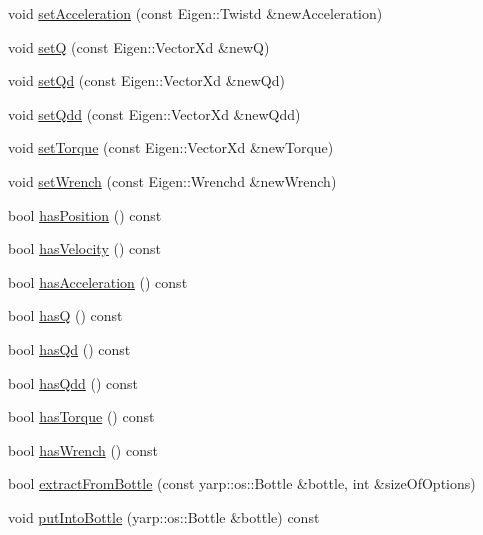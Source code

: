 \begin{DoxyCompactItemize}
\item 
void \hyperlink{classocra_1_1TaskState_ab408a5c4b442ac5ad3f5d50fec1aefdb}{set\+Acceleration} (const Eigen\+::\+Twistd \&new\+Acceleration)
\item 
void \hyperlink{classocra_1_1TaskState_a2a1821ebe86ba99e305debf366ce77f1}{setQ} (const Eigen\+::\+Vector\+Xd \&newQ)
\item 
void \hyperlink{classocra_1_1TaskState_a69d8a03ebd5c2c41e8108ff4b845ae49}{set\+Qd} (const Eigen\+::\+Vector\+Xd \&new\+Qd)
\item 
void \hyperlink{classocra_1_1TaskState_aa5e16bbe025ef970a18a12e0fe841c80}{set\+Qdd} (const Eigen\+::\+Vector\+Xd \&new\+Qdd)
\item 
void \hyperlink{classocra_1_1TaskState_a412f64cf9b8bc08186a83c5afda7cb7d}{set\+Torque} (const Eigen\+::\+Vector\+Xd \&new\+Torque)
\item 
void \hyperlink{classocra_1_1TaskState_a030fc926c45428d7ef99deb70ce5153e}{set\+Wrench} (const Eigen\+::\+Wrenchd \&new\+Wrench)
\item 
bool \hyperlink{classocra_1_1TaskState_a1f6358128f62c6200b9a48b0600d58b8}{has\+Position} () const
\item 
bool \hyperlink{classocra_1_1TaskState_acbadab55cd6c9d68bd328139f6265f8a}{has\+Velocity} () const
\item 
bool \hyperlink{classocra_1_1TaskState_a345c1cdb0c0bc05d087153b3018a1811}{has\+Acceleration} () const
\item 
bool \hyperlink{classocra_1_1TaskState_aad8be338fe82467edd8060644176e82e}{hasQ} () const
\item 
bool \hyperlink{classocra_1_1TaskState_aeb4c2c7b03a9f5fa36a63043c6eb1dd5}{has\+Qd} () const
\item 
bool \hyperlink{classocra_1_1TaskState_a072110d094ace71841b284f77202eeb0}{has\+Qdd} () const
\item 
bool \hyperlink{classocra_1_1TaskState_a994d367f5b29c37b9c68fb7aa7b2fc43}{has\+Torque} () const
\item 
bool \hyperlink{classocra_1_1TaskState_a9f51de95fd8731458ea9e111924d5211}{has\+Wrench} () const
\item 
bool \hyperlink{classocra_1_1TaskState_a64816fe1fdea6deaf1abfef335ab36c7}{extract\+From\+Bottle} (const yarp\+::os\+::\+Bottle \&bottle, int \&size\+Of\+Options)
\item 
void \hyperlink{classocra_1_1TaskState_aaf49d858337f9dee73b22eefc367fd35}{put\+Into\+Bottle} (yarp\+::os\+::\+Bottle \&bottle) const
\end{DoxyCompactItemize}
